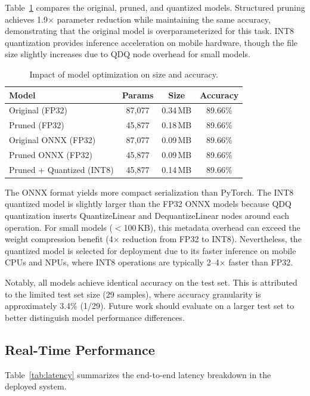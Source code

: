 Table~\ref{tab:compression} compares the original, pruned, and
quantized models. Structured pruning achieves 1.9$\times$ parameter
reduction while maintaining the same accuracy, demonstrating that
the original model is overparameterized for this task. INT8
quantization provides inference acceleration on mobile hardware,
though the file size slightly increases due to QDQ node overhead
for small models.

\begin{table}[ht]
\centering
\caption{Impact of model optimization on size and accuracy.}
\label{tab:compression}
\begin{tabular}{@{}lccc@{}}
\toprule
\textbf{Model} & \textbf{Params} & \textbf{Size} & \textbf{Accuracy} \\
\midrule
Original (FP32) & 87,077 & 0.34\,MB & 89.66\% \\
Pruned (FP32) & 45,877 & 0.18\,MB & 89.66\% \\
Original ONNX (FP32) & 87,077 & 0.09\,MB & 89.66\% \\
Pruned ONNX (FP32) & 45,877 & 0.09\,MB & 89.66\% \\
Pruned + Quantized (INT8) & 45,877 & 0.14\,MB & 89.66\% \\
\bottomrule
\end{tabular}
\end{table}

The ONNX format yields more compact serialization than PyTorch. The
INT8 quantized model is slightly larger than the FP32 ONNX models
because QDQ quantization inserts QuantizeLinear and DequantizeLinear
nodes around each operation. For small models ($<$100\,KB), this
metadata overhead can exceed the weight compression benefit (4$\times$
reduction from FP32 to INT8). Nevertheless, the quantized model is
selected for deployment due to its faster inference on mobile CPUs
and NPUs, where INT8 operations are typically 2--4$\times$ faster
than FP32.

Notably, all models achieve identical accuracy on the test set.
This is attributed to the limited test set size (29 samples), where
accuracy granularity is approximately 3.4\% (1/29). Future work
should evaluate on a larger test set to better distinguish model
performance differences.

\subsection{Real-Time Performance}

Table~\ref{tab:latency} summarizes the end-to-end latency breakdown in
the deployed system.

